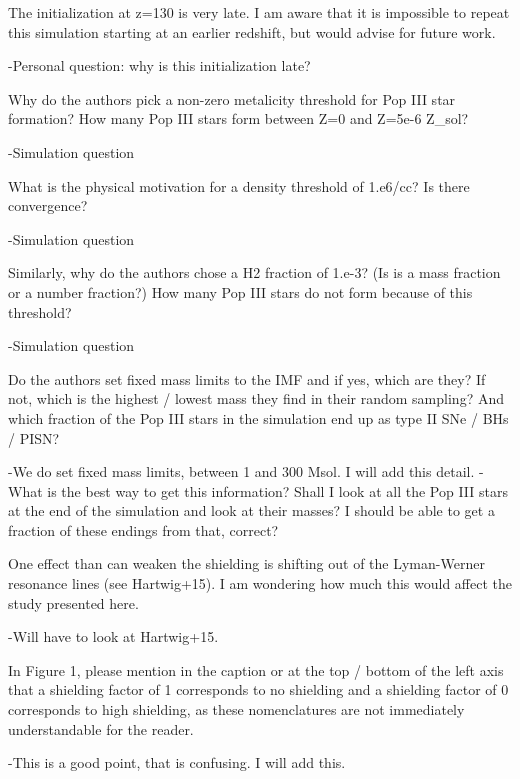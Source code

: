 \documentclass[11pt]{article}
\begin{document}
\begin{referee}
The initialization at z=130 is very late. I am aware that it is impossible to repeat this simulation starting at an earlier redshift, but would advise for future work.
\end{referee}
-Personal question: why is this initialization late?

\begin{referee}
Why do the authors pick a non-zero metalicity threshold for Pop III star formation? How many Pop III stars form between Z=0 and Z=5e-6 Z_sol?
\end{referee}
-Simulation question


\begin{referee}
What is the physical motivation for a density threshold of 1.e6/cc? Is there convergence? 
\end{referee}
-Simulation question

\begin{referee}
Similarly, why do the authors chose a H2 fraction of 1.e-3? (Is is a mass fraction or a number fraction?) How many Pop III stars do not form because of this threshold?
\end{referee}
-Simulation question

\begin{referee}
Do the authors set fixed mass limits to the IMF and if yes, which are they? If not, which is the highest / lowest mass they find in their random sampling? And which fraction of the Pop III stars in the simulation end up as type II SNe / BHs / PISN?
\end{referee}
-We do set fixed mass limits, between 1 and 300 Msol. I will add this detail. 
-What is the best way to get this information? Shall I look at all the Pop III stars at the end of the simulation and look at their masses? I should be able to get a fraction of these endings from that, correct?

\begin{referee}
One effect than can weaken the shielding is shifting out of the Lyman-Werner resonance lines (see Hartwig+15). I am wondering how much this would affect the study presented here. 
\end{referee}
-Will have to look at Hartwig+15. 

\begin{referee}
In Figure 1, please mention in the caption or at the top / bottom of the left axis that a shielding factor of 1 corresponds to no shielding and a shielding factor of 0 corresponds to high shielding, as these nomenclatures are not immediately understandable for the reader.
\end{referee}
-This is a good point, that is confusing. I will add this.
\end{document}
